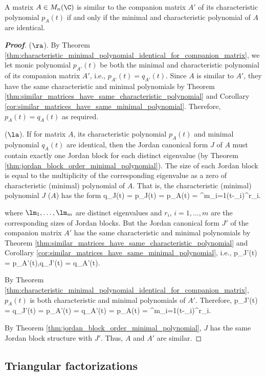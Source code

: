 \begin{theorem}
A matrix $A\in M_n(\C)$ is similar to the companion matrix $A'$ of its characteristic polynomial $p_A(t)$ if and only if the minimal and characteristic polynomial of $A$ are identical.
\end{theorem}

\begin{proof}[\bf Proof]
($\ra$). By Theorem \ref{thm:characteristic_minimal_polynomial_identical_for_companion_matrix}, we let monic polynomial $p_{A'}(t)$ be both the minimal and characteristic polynomial of its companion
matrix $A'$, i.e., $p_{A'}(t) = q_{A'}(t)$. Since $A$ is similar to $A'$, they have the same characteristic and minimal polynomials by Theorem
\ref{thm:similar_matrices_have_same_characteristic_polynomial} and Corollary \ref{cor:similar_matrices_have_same_minimal_polynomial}. Therefore, $p_A(t) = q_A(t)$ as required.

($\la$). If for matrix $A$, its characteristic polynomial $p_A(t)$ and minimal polynomial $q_A(t)$ are identical, then the Jordan canonical form $J$ of $A$ must contain exactly one Jordan block for each
distinct eigenvalue (by Theorem \ref{thm:jordan_block_order_minimal_polynomial}). The size of each Jordan block is equal to the multiplicity of the corresponding eigenvalue as a zero of
characteristic (minimal) polynomial of $A$. That is, the characteristic (minimal) polynomial $J$ ($A$) has the form
\be
q_J(t) = p_J(t) = p_A(t) = \prod^m_{i=1}(t-\lm_i)^{r_i}.
\ee

where $\lm_1,\dots,\lm_m$ are distinct eigenvalues and $r_i$, $i=1,\dots,m$ are the corresponding sizes of Jordan blocks. But the Jordan canonical form $J'$ of the companion matrix $A'$ has the same
characteristic and minimal polynomials by Theorem \ref{thm:similar_matrices_have_same_characteristic_polynomial} and Corollary \ref{cor:similar_matrices_have_same_minimal_polynomial}, i.e.,
\be
p_{J'}(t) = p_{A'}(t),\qquad q_{J'}(t) = q_{A'}(t).
\ee

By Theorem \ref{thm:characteristic_minimal_polynomial_identical_for_companion_matrix}, $p_A(t)$ is both characteristic and minimal polynomials of $A'$. Therefore,
\be
p_{J'}(t) = q_{J'}(t) = p_{A'}(t) = q_{A'}(t) = p_A(t) = \prod^m_{i=1}(t-\lm_i)^{r_i}.
\ee

By Theorem \ref{thm:jordan_block_order_minimal_polynomial}, $J$ has the same Jordan block structure with $J'$. Thus, $A$ and $A'$ are similar.
\end{proof}


\subsection{Triangular factorizations}

